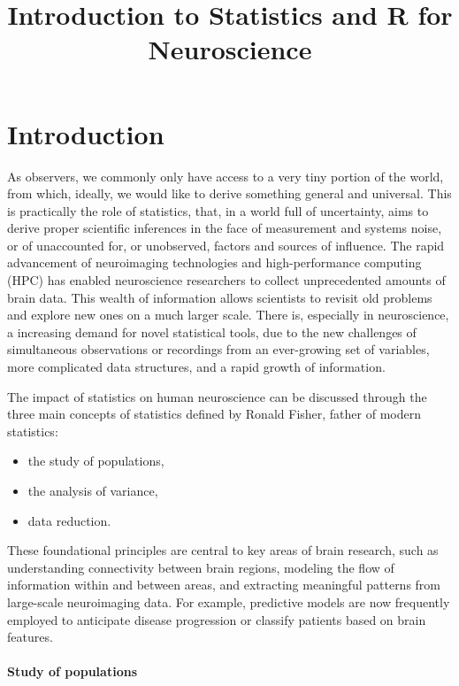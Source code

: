 \documentclass[
]{article}
\title{Introduction to Statistics and R for Neuroscience}
\author{}
\date{\vspace{-2.5em}}
\providecommand{\tightlist}{%
  \setlength{\itemsep}{0pt}\setlength{\parskip}{0pt}}
\begin{document}
\maketitle

{
\setcounter{tocdepth}{2}
\tableofcontents
}
\hypertarget{introduction}{%
\section{Introduction}\label{introduction}}

As observers, we commonly only have access to a very tiny portion of the
world, from which, ideally, we would like to derive something general
and universal. This is practically the role of statistics, that, in a
world full of uncertainty, aims to derive proper scientific inferences
in the face of measurement and systems noise, or of unaccounted for, or
unobserved, factors and sources of influence. The rapid advancement of
neuroimaging technologies and high-performance computing (HPC) has
enabled neuroscience researchers to collect unprecedented amounts of
brain data. This wealth of information allows scientists to revisit old
problems and explore new ones on a much larger scale. There is,
especially in neuroscience, a increasing demand for novel statistical
tools, due to the new challenges of simultaneous observations or
recordings from an ever-growing set of variables, more complicated data
structures, and a rapid growth of information.

The impact of statistics on human neuroscience can be discussed through
the three main concepts of statistics defined by Ronald Fisher, father
of modern statistics:

\begin{itemize}
\tightlist
\item
  the study of populations,
\item
  the analysis of variance,
\item
  data reduction.
\end{itemize}

These foundational principles are central to key areas of brain
research, such as understanding connectivity between brain regions,
modeling the flow of information within and between areas, and
extracting meaningful patterns from large-scale neuroimaging data. For
example, predictive models are now frequently employed to anticipate
disease progression or classify patients based on brain features.

\hypertarget{study-of-populations}{%
\paragraph{Study of populations}\label{study-of-populations}}
\end{document}
